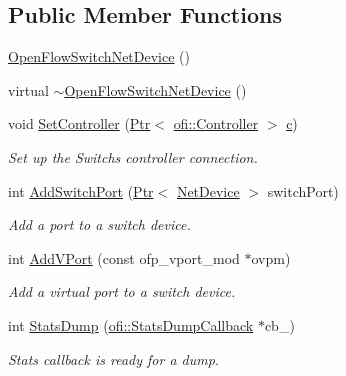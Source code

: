 \subsection*{Public Member Functions}
\begin{DoxyCompactItemize}
\item 
\hyperlink{classns3_1_1OpenFlowSwitchNetDevice_a11e21c621ed1fc60bf76a592cb680d3f}{Open\+Flow\+Switch\+Net\+Device} ()
\item 
virtual \hyperlink{classns3_1_1OpenFlowSwitchNetDevice_afea7b099a698e5ff80d2ac177cae69bf}{$\sim$\+Open\+Flow\+Switch\+Net\+Device} ()
\item 
void \hyperlink{classns3_1_1OpenFlowSwitchNetDevice_a97be3cb2eeab82c224f82b7ffc63beb4}{Set\+Controller} (\hyperlink{classns3_1_1Ptr}{Ptr}$<$ \hyperlink{classns3_1_1ofi_1_1Controller}{ofi\+::\+Controller} $>$ \hyperlink{mmwave_2model_2fading-traces_2fading__trace__generator_8m_ae0323a9039add2978bf5b49550572c7c}{c})
\begin{DoxyCompactList}\small\item\em Set up the Switch\textquotesingle{}s controller connection. \end{DoxyCompactList}\item 
int \hyperlink{classns3_1_1OpenFlowSwitchNetDevice_a917303759eded2d67d5d7807551d3d3a}{Add\+Switch\+Port} (\hyperlink{classns3_1_1Ptr}{Ptr}$<$ \hyperlink{classns3_1_1NetDevice}{Net\+Device} $>$ switch\+Port)
\begin{DoxyCompactList}\small\item\em Add a \textquotesingle{}port\textquotesingle{} to a switch device. \end{DoxyCompactList}\item 
int \hyperlink{classns3_1_1OpenFlowSwitchNetDevice_ad080768a6e246533386d1703e86d38e6}{Add\+V\+Port} (const ofp\+\_\+vport\+\_\+mod $\ast$ovpm)
\begin{DoxyCompactList}\small\item\em Add a virtual port to a switch device. \end{DoxyCompactList}\item 
int \hyperlink{classns3_1_1OpenFlowSwitchNetDevice_aa1e672674ec0878d2bbece811450691a}{Stats\+Dump} (\hyperlink{structns3_1_1ofi_1_1StatsDumpCallback}{ofi\+::\+Stats\+Dump\+Callback} $\ast$cb\+\_\+)
\begin{DoxyCompactList}\small\item\em Stats callback is ready for a dump. \end{DoxyCompactList}\item 

\end{DoxyCompactItemize}
